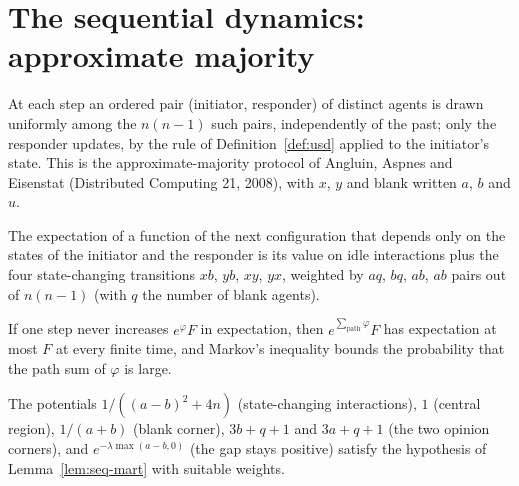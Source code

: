 \section{The sequential dynamics: approximate majority}\label{sec:aae-approx-majority}
\begin{definition}\label{def:seq}
\leanok
{}
At each step an ordered pair (initiator, responder) of distinct agents is drawn uniformly among
the $n(n-1)$ such pairs, independently of the past; only the responder updates, by the rule of
Definition~\ref{def:usd} applied to the initiator's state. This is the approximate-majority
protocol of Angluin, Aspnes and Eisenstat (Distributed Computing 21, 2008), with $x$, $y$ and
blank written $a$, $b$ and $u$.
\end{definition}
\begin{lemma}\label{lem:seq-step}
\leanok
{}
The expectation of a function of the next configuration that depends only on the states of the
initiator and the responder is its value on idle interactions plus the four state-changing
transitions $xb$, $yb$, $xy$, $yx$, weighted by $aq$, $bq$, $ab$, $ab$ pairs out of $n(n-1)$
(with $q$ the number of blank agents).
\end{lemma}
\begin{lemma}\label{lem:seq-mart}
\leanok
If one step never increases $e^{\varphi}F$ in expectation, then $e^{\sum_{\text{path}}\varphi}F$
has expectation at most $F$ at every finite time, and Markov's inequality bounds the probability
that the path sum of $\varphi$ is large.
\end{lemma}
\begin{lemma}\label{lem:seq-pot}
\leanok
{}
The potentials $1/((a-b)^2+4n)$ (state-changing interactions), $1$ (central region), $1/(a+b)$
(blank corner), $3b+q+1$ and $3a+q+1$ (the two opinion corners), and $e^{-\lambda\max(a-b,0)}$
(the gap stays positive) satisfy the hypothesis of Lemma~\ref{lem:seq-mart} with suitable
weights.
\end{lemma}
